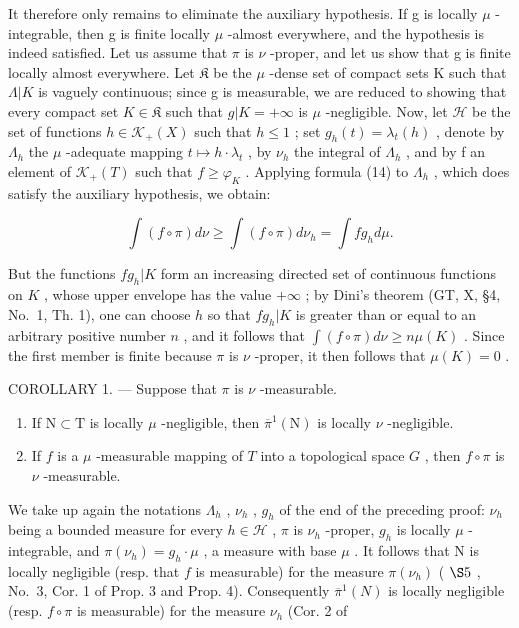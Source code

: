 It therefore only remains to eliminate the auxiliary hypothesis. If g is locally \(\mu\) -integrable, then g is finite locally \(\mu\) -almost everywhere, and the hypothesis is indeed satisfied. Let us assume that \(\pi\) is \(\nu\) -proper, and let us show that g is finite locally almost everywhere. Let \(\mathfrak{K}\) be the \(\mu\) -dense set of compact sets K such that \(\Lambda|K\) is vaguely continuous; since g is measurable, we are reduced to showing that every compact set \(K \in \mathfrak{K}\) such that \(g|K = +\infty\) is \(\mu\) -negligible. Now, let \(\mathcal{H}\) be the set of functions \(h \in \mathcal{K}_{+}(X)\) such that \(h \leqslant 1\) ; set \(g_{h}(t) = \lambda_{t}(h)\) , denote by \(\Lambda_{h}\) the \(\mu\) -adequate mapping \(t \mapsto h \cdot \lambda_{t}\) , by \(\nu_{h}\) the integral of \(\Lambda_{h}\) , and by f an element of \(\mathcal{K}_{+}(T)\) such that \(f \geqslant \varphi_{K}\) . Applying formula (14) to \(\Lambda_{h}\) , which does satisfy the auxiliary hypothesis, we obtain:

\[
\int (f \circ \pi) d \nu \geqslant \int (f \circ \pi) d \nu_ {h} = \int f g _ {h} d \mu .
\]

But the functions \(fg_h|K\) form an increasing directed set of continuous functions on \(K\) , whose upper envelope has the value \(+\infty\) ; by Dini's theorem (GT, X, §4, No.~1, Th. 1), one can choose \(h\) so that \(fg_h|K\) is greater than or equal to an arbitrary positive number \(n\) , and it follows that \(\int(f \circ \pi) d\nu \geqslant n \mu(K)\) . Since the first member is finite because \(\pi\) is \(\nu\) -proper, it then follows that \(\mu(K) = 0\) .

COROLLARY 1. --- Suppose that \(\pi\) is \(\nu\) -measurable.

\begin{enumerate}
\def\labelenumi{\alph{enumi})}
\item
  If \(\mathrm{N}\subset \mathrm{T}\) is locally \(\mu\) -negligible, then \(\overline{\pi}^{1}(\mathrm{N})\) is locally \(\nu\) -negligible.
\item
  If \(f\) is a \(\mu\) -measurable mapping of \(T\) into a topological space \(G\) , then \(f \circ \pi\) is \(\nu\) -measurable.
\end{enumerate}

We take up again the notations \(\Lambda_h\) , \(\nu_h\) , \(g_h\) of the end of the preceding proof: \(\nu_h\) being a bounded measure for every \(h \in \mathcal{H}\) , \(\pi\) is \(\nu_h\) -proper, \(g_h\) is locally \(\mu\) -integrable, and \(\pi(\nu_h) = g_h \cdot \mu\) , a measure with base \(\mu\) . It follows that N is locally negligible (resp. that \(f\) is measurable) for the measure \(\pi(\nu_h)\) ( \(\S 5\) , No.~3, Cor. 1 of Prop. 3 and Prop. 4). Consequently \(\overline{\pi}^1(N)\) is locally negligible (resp. \(f \circ \pi\) is measurable) for the measure \(\nu_h\) (Cor. 2 of

